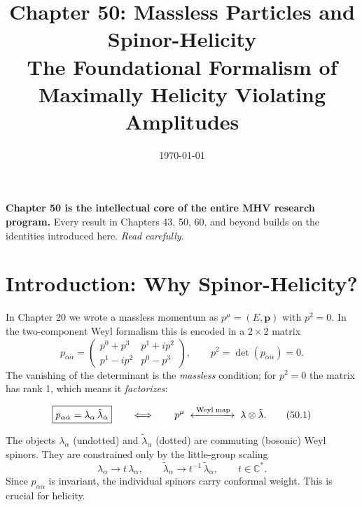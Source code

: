 \documentclass[12pt]{article}
\begin{document}
\title{Chapter 50: Massless Particles and Spinor-Helicity\\[6pt]
\large The Foundational Formalism of Maximally Helicity Violating Amplitudes}
\date{\today}
\maketitle

\begin{mdframed}[backgroundcolor=blue!5]
\textbf{Chapter 50 is the intellectual core of the entire MHV research program.}
Every result in Chapters 43, 50, 60, and beyond builds on the identities
introduced here. \emph{Read carefully.}
\end{mdframed}

\tableofcontents
\newpage

\section{Introduction: Why Spinor-Helicity?}

In Chapter 20 we wrote a massless momentum as $p^\mu=(E,\mathbf{p})$ with
$p^2=0$.  In the two-component Weyl formalism this is encoded in a
$2\times2$ matrix
\begin{equation}
p_{\alpha\dot\alpha}
= \begin{pmatrix} p^0+p^3 & p^1+ip^2 \\ p^1-ip^2 & p^0-p^3 \end{pmatrix},
\qquad p^2 = \det(p_{\alpha\dot\alpha}) = 0 .
\end{equation}
The vanishing of the determinant is the \emph{massless} condition; for $p^2=0$
the matrix has rank 1, which means it \emph{factorizes}:

\begin{mdframed}[backgroundcolor=green!5]
\begin{equation}
\boxed{p_{\alpha\dot\alpha}
= \lambda_\alpha\,\tilde\lambda_{\dot\alpha}}
\qquad\Longleftrightarrow\qquad
p^\mu \;\xleftrightarrow{\;\mathrm{Weyl\;map}\;}\;
\lambda\otimes\tilde\lambda .
\tag{50.1}
\end{equation}
\end{mdframed}

The objects $\lambda_\alpha$ (undotted) and $\tilde\lambda_{\dot\alpha}$
(dotted) are commuting (bosonic) Weyl spinors.  They are constrained only by the
little-group scaling
\begin{equation}
\lambda_\alpha\to t\,\lambda_\alpha,\qquad
\tilde\lambda_{\dot\alpha}\to t^{-1}\,\tilde\lambda_{\dot\alpha},
\qquad t\in\mathbb{C}^* .
\tag{50.2}
\end{equation}
Since $p_{\alpha\dot\alpha}$ is invariant, the individual spinors carry
conformal weight.  This is crucial for helicity.
\end{document}
